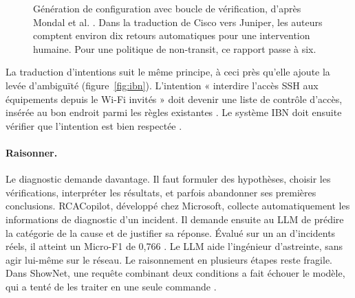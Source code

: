 \begin{figure}[htbp]
\centering
{}
\caption{Génération de configuration avec boucle de vérification, d'après Mondal et al. \cite{mondal2023}. Dans la traduction de Cisco vers Juniper, les auteurs comptent environ dix retours automatiques pour une intervention humaine. Pour une politique de non-transit, ce rapport passe à six.}
\label{fig:boucle}
\end{figure}

La traduction d'intentions suit le même principe, à ceci près qu'elle ajoute la levée d'ambiguïté (figure~\ref{fig:ibn}). L'intention « interdire l'accès SSH aux équipements depuis le Wi-Fi invités » doit devenir une liste de contrôle d'accès, insérée au bon endroit parmi les règles existantes \cite{mondal2025}. Le système IBN doit ensuite vérifier que l'intention est bien respectée \cite{clemm2022}.

\paragraph{Raisonner.}
Le diagnostic demande davantage. Il faut formuler des hypothèses, choisir les vérifications, interpréter les résultats, et parfois abandonner ses premières conclusions. RCACopilot, développé chez Microsoft, collecte automatiquement les informations de diagnostic d'un incident. Il demande ensuite au LLM de prédire la catégorie de la cause et de justifier sa réponse. Évalué sur un an d'incidents réels, il atteint un Micro-F1 de 0,766 \cite{chen2024}. Le LLM aide l'ingénieur d'astreinte, sans agir lui-même sur le réseau. Le raisonnement en plusieurs étapes reste fragile. Dans ShowNet, une requête combinant deux conditions a fait échouer le modèle, qui a tenté de les traiter en une seule commande \cite{nakamura2026}.

